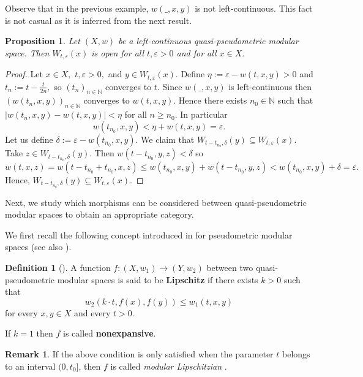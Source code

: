 \documentclass[11pt,a4paper]{amsart}
\newtheorem{proposition}[theorem]{Proposition}
\theoremstyle{definition}
\newtheorem{definition}[theorem]{Definition}
\newtheorem{remark}[theorem]{Remark}
\begin{document}
	Observe that in the previous example, $w(\_,x,y)$ is not left-continuous. This fact is not casual as it is inferred from the next result.
	
	\begin{proposition}
		Let $(X,w)$ be a left-continuous quasi-pseudometric modular space. Then $W_{t,\varepsilon}(x)$ is open for all $t,\varepsilon>0$ and for all $x\in X.$
	\end{proposition}
	
	\begin{proof}
		Let $x\in X,$ $t,\varepsilon>0,$ and $y\in W_{t,\varepsilon}(x)$. Define $\eta:=\varepsilon-w(t,x,y)>0$ and $t_n:=t-\frac{t}{2n},$ so $(t_n)_{n\in\mathbb{N}}$ converges to $t.$ Since $w(\_,x,y)$ is left-continuous then $(w\left(t_n,x,y\right))_{n\in\mathbb{N}}$ converges to $w(t,x,y)$. Hence there exists $n_0\in\mathbb{N}$ such that $|w(t_n,x,y)-w(t,x,y)|<\eta$ for all $n\geq n_0$. In particular
		\[w(t_{n_0},x,y)<\eta+w(t,x,y)=\varepsilon.\]
		Let us define $\delta:=\varepsilon-w(t_{n_0},x,y)$. We claim that $W_{t-t_{n_0},\delta}(y)\subseteq W_{t,\varepsilon}(x)$. Take $z\in W_{t-t_{n_0},\delta}(y)$. Then $w(t-t_{n_0},y,z)<\delta$ so
		\[w(t,x,z)=w(t-t_{n_0}+t_{n_0},x,z)\leq w(t_{n_0},x,y)+w(t-t_{n_0},y,z)<w(t_{n_0},x,y)+\delta=\varepsilon.\]
		Hence, $W_{t-t_{n_0},\delta}(y)\subseteq W_{t,\varepsilon}(x)$.
	\end{proof}
	
	
	
	
	
	
	
	Next, we study which morphisms can be considered between quasi-pseudo\-metric modular spaces to obtain an appropriate category.
	
	We first recall the following concept introduced in \cite{MonSintuKumam11,OOSebo22} for pseudometric modular spaces (see also \cite{DehEshaEba12}).
	
	
	\begin{definition}[\cite{MonSintuKumam11,OOSebo22}]
		A function $f:(X,w_1)\to (Y,w_2)$ between two quasi-pseudometric modular spaces is said to be \textbf{Lipschitz} if there exists $k>0$ such that
		$$w_2(k\cdot t,f(x),f(y))\leq w_1(t,x,y)$$
		for every $x,y\in X$ and every $t>0.$
		
		If $k=1$ then $f$ is called \textbf{nonexpansive}.
	\end{definition}
	
	\begin{remark}
		If the above condition is only satisfied when the parameter $t$ belongs to an interval $(0,t_0]$, then $f$ is called \emph{modular Lipschitzian} \cite{Chis15b}.
	\end{remark}
	
\end{document}
